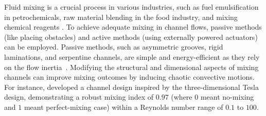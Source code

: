 \documentclass[reprint,a4paper,fleqn]{cas-dc} %
\begin{document}

	Fluid mixing is a crucial process in various industries, such as fuel emulsification in petrochemicals, raw material blending in the food industry, and mixing chemical reagents \citep{Yeh2015, Nunez-Flores2020, Peterwitz2021,Wang2021}. To achieve adequate mixing in channel flows, passive methods (like placing obstacles) and active methods (using externally powered actuators) can be employed. Passive methods, such as asymmetric grooves, rigid laminations, and serpentine channels, are simple and energy-efficient as they rely on the flow inertia~\citep{Nguyen2005, Yang_2008, Afzal_2014, Kashid2011, Kang2015,Derksen2010}. Modifying the structural and dimensional aspects of mixing channels can improve mixing outcomes by inducing chaotic convective motions. For instance, \cite{Yang2015} developed a channel design inspired by the three-dimensional Tesla design, demonstrating a robust mixing index of $0.97$ (where $0$ meant no-mixing and $1$ meant perfect-mixing case) within a Reynolds number range of $0.1$ to $100$.
\end{document}
